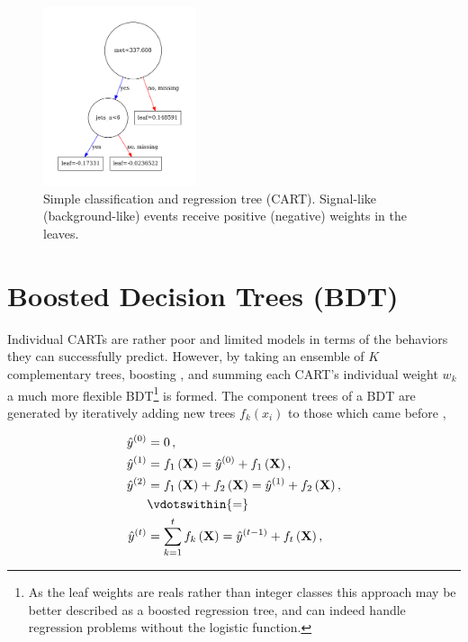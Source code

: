 \begin{figure}[H]
\centering
\includegraphics[width=0.4\textwidth]{figures/ml/tree7_g2000_n1200}
\caption{
Simple classification and regression tree (CART).
Signal-like (background-like) events receive positive (negative) weights in the leaves.
}
\label{class:CART:small_example_CART}
\end{figure}


\section{Boosted Decision Trees (BDT)}
\label{class:BDT}

Individual CARTs are rather poor and limited models
in terms of the behaviors they can successfully predict.
However, by taking an ensemble of $K$ complementary trees, \ie boosting \cite{FREUND1997119,friedman2000},
and summing each CART's individual weight $w_{k}$ a much more flexible BDT\footnote{As the leaf weights
are reals rather than integer classes this approach may be better described as a boosted regression tree,
and can indeed handle regression problems without the logistic function.} is formed.
The component trees of a BDT are generated by iteratively adding new trees $f_{k}\left(x_{i}\right)$ to those which came before \cite{XGBoost},

\begin{equation} \label{eq:boosting}
\begin{aligned}
\hat{y}^{\left(0\right)} &= 0\,, \\
\hat{y}^{\left(1\right)} &= f_1\left(\mathbf{X}\right) = \hat{y}^{\left(0\right)} + f_1\left(\mathbf{X}\right), \\
\hat{y}^{\left(2\right)} &= f_1\left(\mathbf{X}\right) + f_2\left(\mathbf{X}\right)= \hat{y}^{\left(1\right)} + f_2\left(\mathbf{X}\right), \\
                           &\vdotswithin{\displaystyle =} \\
\hat{y}^{\left(t\right)} &= \sum_{k=1}^t f_k\left(\mathbf{X}\right)= \hat{y}^{\left(t-1\right)} + f_t\left(\mathbf{X}\right),
\end{aligned}
\end{equation}

